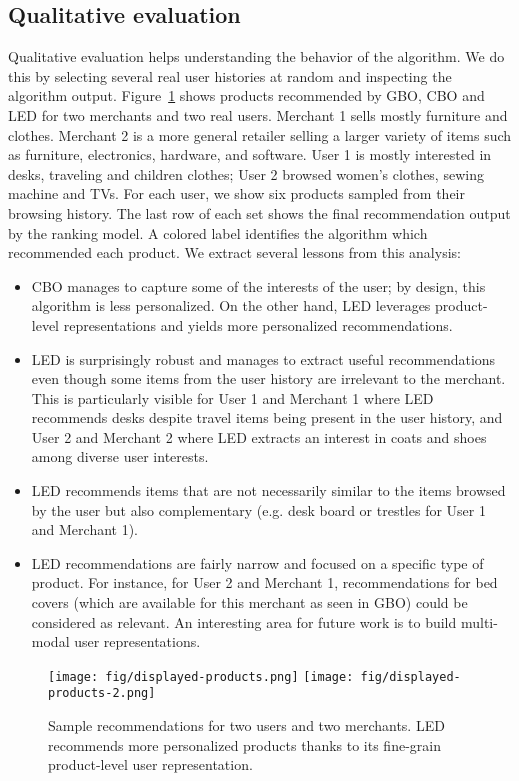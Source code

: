\documentclass[sigconf]{acmart}
\begin{document}
\subsection{Qualitative evaluation}

Qualitative evaluation helps understanding the behavior of the algorithm. We do this by selecting several real user histories at random and inspecting the algorithm output. Figure~\ref{fig:viewer-results} shows products recommended by GBO, CBO and LED for two merchants and two real users. Merchant 1 sells mostly furniture and clothes. Merchant 2 is a more general retailer selling a larger variety of items such as furniture, electronics, hardware, and software. User 1 is mostly interested in desks, traveling and children clothes; User 2 browsed women's clothes, sewing machine and TVs. For each user, we show six products sampled from their browsing history. The last row of each set shows the final recommendation output by the ranking model. A colored label identifies the algorithm which recommended each product. We extract several lessons from this analysis:

\begin{itemize}
    \item CBO manages to capture some of the interests of the user; by design, this algorithm is less personalized. On the other hand, LED leverages product-level representations and yields more personalized recommendations.
    \item LED is surprisingly robust and manages to extract useful recommendations even though some items from the user history are irrelevant to the merchant. This is particularly visible for User 1 and Merchant 1 where LED recommends desks despite travel items being present in the user history, and User 2 and Merchant 2 where LED extracts an interest in coats and shoes among diverse user interests.
    \item LED recommends items that are not necessarily similar to the items browsed by the user but also complementary (e.g. desk board or trestles for User 1 and Merchant 1).
    \item LED recommendations are fairly narrow and focused on a specific type of product. For instance, for User 2 and Merchant 1, recommendations for bed covers (which are available for this merchant as seen in GBO) could be considered as relevant. An interesting area for future work is to build multi-modal user representations.
\end{itemize}


\begin{figure}[h]
    \centering
    \texttt{[image: fig/displayed-products.png]}
    \texttt{[image: fig/displayed-products-2.png]}
    \caption{Sample recommendations for two users and two merchants. LED recommends more personalized products thanks to its fine-grain product-level user representation.}
    \label{fig:viewer-results}
\end{figure}
\end{document}

